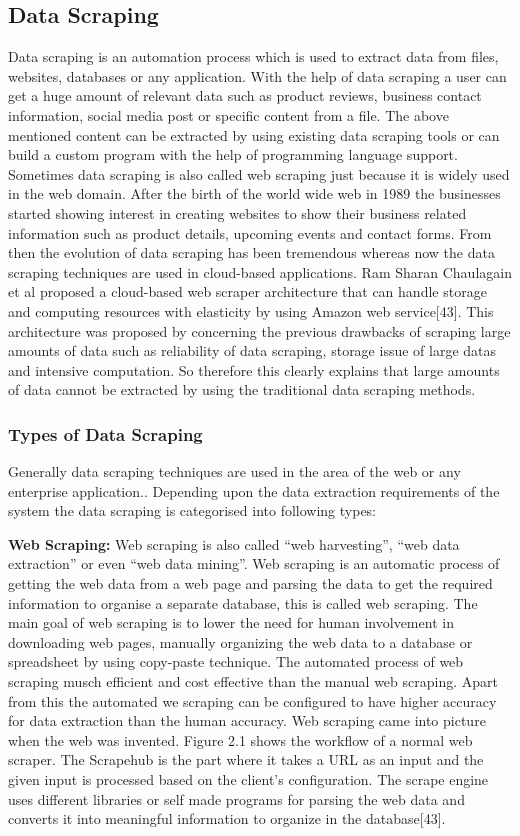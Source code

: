 \subsection{Data Scraping}
Data scraping is an automation process which is used to extract data from files, websites, databases or any application. With the help of data scraping a user can get a huge amount of relevant data such as product reviews, business contact information, social media post or specific content from a file. The above mentioned content can be extracted by using existing data scraping tools or can build a custom program with the help of programming language support. Sometimes data scraping is also called web scraping just because it is widely used in the web domain. After the birth of the world wide web in 1989 the businesses started showing interest in creating websites to show their business related information such as product details, upcoming events and contact forms. From then the evolution of data scraping has been tremendous whereas now the data scraping techniques are used in cloud-based applications. Ram Sharan Chaulagain et al proposed a cloud-based web scraper architecture that can handle storage and computing resources with elasticity by using Amazon web service[43]. This architecture was proposed by concerning the previous drawbacks of scraping large amounts of data such as reliability of data scraping, storage issue of large datas and intensive computation. So therefore this clearly explains that large amounts of data cannot be extracted by using the traditional data scraping methods.

\subsubsection{Types of Data Scraping}
Generally data scraping techniques are used in the area of the web or any enterprise application.. Depending upon the data extraction requirements of the system the data scraping is categorised into following types: 

{\bf Web Scraping:} Web scraping is also called “web harvesting”, “web data extraction” or even “web data mining”. Web scraping is an automatic process of getting the web data from a web page and parsing the data  to get the required information to organise a separate database, this is called web scraping. The main goal of web scraping is to lower the need for human involvement in downloading web pages, manually organizing the web data to a database or spreadsheet by using copy-paste technique. The automated process of web scraping musch efficient and cost effective than the manual web scraping. Apart from this the automated we scraping can be configured to have higher accuracy for data extraction than the human accuracy. Web scraping came into picture when the web was invented. Figure 2.1 shows the workflow of a normal web scraper. The Scrapehub is the part where it takes a URL as an input and the given input is processed based on the client’s configuration. The scrape engine uses different libraries or self made programs for parsing the web data and converts it into meaningful information to organize in the database[43].

